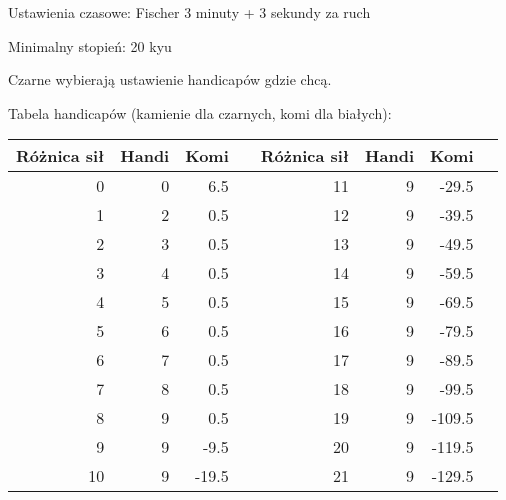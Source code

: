 



Ustawienia czasowe: Fischer 3 minuty + 3 sekundy za ruch

Minimalny stopień: 20 kyu

Czarne wybierają ustawienie handicapów gdzie chcą.

Tabela handicapów (kamienie dla czarnych, komi dla białych):

\bigskip

\setlength{\extrarowheight}{7pt}
\begin{tabularx}{\textwidth}{| r r r X | r r r X |}
\hline
Różnica sił & Handi &  Komi & & Różnica sił & Handi &   Komi & \\ \hline
          0 &     0 &   6.5 & &          11 &     9 &  -29.5 & \\ \hline
          1 &     2 &   0.5 & &          12 &     9 &  -39.5 & \\ \hline
          2 &     3 &   0.5 & &          13 &     9 &  -49.5 & \\ \hline
          3 &     4 &   0.5 & &          14 &     9 &  -59.5 & \\ \hline
          4 &     5 &   0.5 & &          15 &     9 &  -69.5 & \\ \hline
          5 &     6 &   0.5 & &          16 &     9 &  -79.5 & \\ \hline
          6 &     7 &   0.5 & &          17 &     9 &  -89.5 & \\ \hline
          7 &     8 &   0.5 & &          18 &     9 &  -99.5 & \\ \hline
          8 &     9 &   0.5 & &          19 &     9 & -109.5 & \\ \hline
          9 &     9 &  -9.5 & &          20 &     9 & -119.5 & \\ \hline
         10 &     9 & -19.5 & &          21 &     9 & -129.5 & \\ \hline
\end{tabularx}



